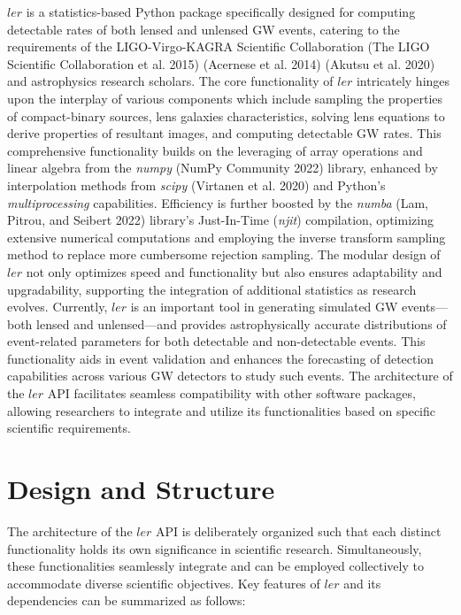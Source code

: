 \documentclass[10pt,a4paper,onecolumn]{article}
\begin{document}
\(ler\) is a statistics-based Python package specifically designed for
computing detectable rates of both lensed and unlensed GW events,
catering to the requirements of the LIGO-Virgo-KAGRA Scientific
Collaboration (The LIGO Scientific Collaboration et al. 2015) (Acernese
et al. 2014) (Akutsu et al. 2020) and astrophysics research scholars.
The core functionality of \(ler\) intricately hinges upon the interplay
of various components which include sampling the properties of
compact-binary sources, lens galaxies characteristics, solving lens
equations to derive properties of resultant images, and computing
detectable GW rates. This comprehensive functionality builds on the
leveraging of array operations and linear algebra from the \emph{numpy}
(NumPy Community 2022) library, enhanced by interpolation methods from
\emph{scipy} (Virtanen et al. 2020) and Python's \emph{multiprocessing}
capabilities. Efficiency is further boosted by the \emph{numba} (Lam,
Pitrou, and Seibert 2022) library's Just-In-Time (\emph{njit})
compilation, optimizing extensive numerical computations and employing
the inverse transform sampling method to replace more cumbersome
rejection sampling. The modular design of \(ler\) not only optimizes
speed and functionality but also ensures adaptability and upgradability,
supporting the integration of additional statistics as research evolves.
Currently, \(ler\) is an important tool in generating simulated GW
events---both lensed and unlensed---and provides astrophysically
accurate distributions of event-related parameters for both detectable
and non-detectable events. This functionality aids in event validation
and enhances the forecasting of detection capabilities across various GW
detectors to study such events. The architecture of the \(ler\) API
facilitates seamless compatibility with other software packages,
allowing researchers to integrate and utilize its functionalities based
on specific scientific requirements.

\section{Design and Structure}\label{design-and-structure}

The architecture of the \(ler\) API is deliberately organized such that
each distinct functionality holds its own significance in scientific
research. Simultaneously, these functionalities seamlessly integrate and
can be employed collectively to accommodate diverse scientific
objectives. Key features of \(ler\) and its dependencies can be
summarized as follows:
\end{document}
